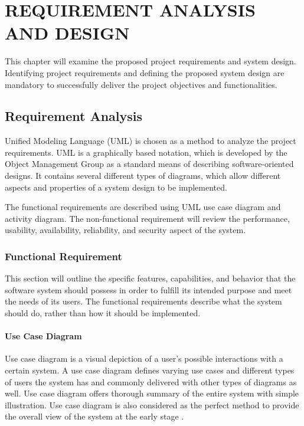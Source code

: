 \documentclass[../index.tex]{subfiles}
\begin{document}
\chapter{REQUIREMENT ANALYSIS AND DESIGN}

This chapter will examine the proposed project requirements and system design. Identifying project
requirements and defining the proposed system design are mandatory to successfully deliver the
project objectives and functionalities.

\section{Requirement Analysis}

Unified Modeling Language (UML) is chosen as a method to analyze the project requirements. UML is a
graphically based notation, which is developed by the Object Management Group as a standard means of
describing software-oriented designs. It contains several different types of diagrams, which allow
different aspects and properties of a system design to be implemented.


The functional requirements are described using UML use case diagram and activity diagram. The
non-functional requirement will review the performance, usability, availability, reliability, and
security aspect of the system.

\subsection{Functional Requirement}

This section will outline the specific features, capabilities, and behavior that the software system
should possess in order to fulfill its intended purpose and meet the needs of its users. The
functional requirements describe what the system should do, rather than how it should be
implemented.

\subsubsection{Use Case Diagram}

Use case diagram is a visual depiction of a user's possible interactions with a certain system. A
use case diagram defines varying use cases and different types of users the system has and commonly
delivered with other types of diagrams as well. Use case diagram offers thorough summary of the
entire system with simple illustration. Use case diagram is also considered as the perfect method to
provide the overall view of the system at the early stage \cite{Shen2003FormalizationTA}.
\end{document}
